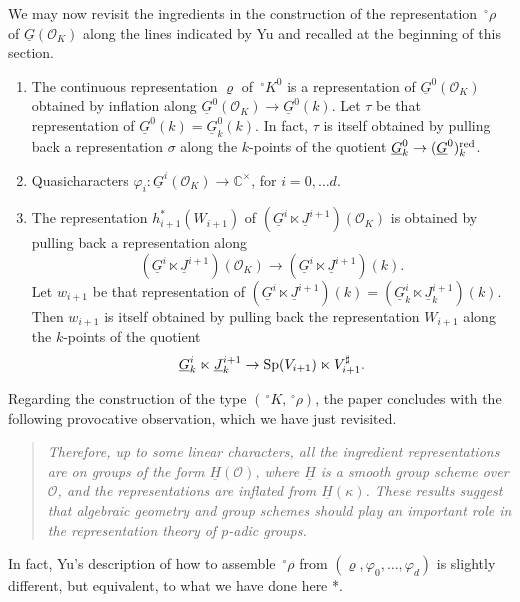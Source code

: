 \documentclass[10pt]{amsart}
\theoremstyle{plain}
\theoremstyle{definition}
\newcommand{\CC}{{\mathbb{C}}}
\newcommand{\OK}{\mathcal{O}_K}
\newcommand{\Fq}{k}
\begin{document}
We may now revisit the ingredients in the construction of the representation $\,^\circ \rho$ of $\underline{G}(\OK)$ along the lines indicated by Yu and recalled at the beginning of this section.
\begin{enumerate}
\item The continuous representation $\varrho$ of $\,^\circ K^0$ is a representation of $\underline{G}^0(\OK)$ obtained by inflation along $\underline{G}^0(\OK) \to \underline{G}^0(\Fq)$. 
Let $\tau$ be that representation of $\underline{G}^0(\Fq) = \underline{G}^0_\Fq(\Fq)$.
In fact, $\tau$ is itself obtained by pulling back a representation $\sigma$ along the $\Fq$-points of the quotient $\underline{G}^0_\Fq \to (\underline{G}^0)_\Fq^\reductive$.
\item Quasicharacters $\varphi_i : \underline{G}^i(\OK) \to \CC^\times$, for $i=0, \ldots d$.
\item The representation $h_{i+1}^*(W_{i+1})$ of $(\underline{G}^i \ltimes \underline{J}^{i+1})(\OK)$ is obtained by pulling back a representation along 
\[
(\underline{G}^i \ltimes \underline{J}^{i+1})(\OK) \to (\underline{G}^i \ltimes \underline{J}^{i+1})(\Fq).
\]
Let $w_{i+1}$ be that representation of $(\underline{G}^i \ltimes \underline{J}^{i+1})(\Fq) = (\underline{G}_\Fq^i \ltimes \underline{J}^{i+1}_\Fq)(\Fq)$. 
Then $w_{i+1}$ is itself obtained by pulling back the representation $W_{i+1}$ along the $\Fq$-points of the quotient
\[
\underline{G}_\Fq^i \ltimes \underline{J}^{i+1}_\Fq \to 
\Sp(V_{i+1}) \ltimes V_{i+1}^\sharp.
\]
\end{enumerate}
Regarding the construction of the type $(\,^\circ  K,\,^\circ \rho)$, the paper \cite{yu:models} concludes with the following provocative observation, which we have just revisited.
\begin{quotation}
{\it Therefore, up to some linear characters, all the ingredient representations are on groups of
 the form $\underline{H}(\mathcal{O})$, where $\underline{H}$ is a smooth group scheme over $\mathcal{O}$, and the representations are inflated from $\underline{H}(\kappa)$. These results suggest that algebraic geometry and group schemes should play an
important role in the representation theory of $p$-adic groups.} \cite{yu:03a}
\end{quotation}

In fact, Yu's description of how to assemble $\,^\circ \rho$ from $(\varrho, \varphi_0, \ldots , \varphi_d)$ is slightly different, but equivalent, to what we have done here \cite{Yu:models}*{}.
\end{document}
